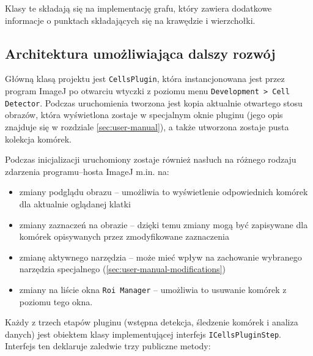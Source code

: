 \documentclass[declaration,shortabstract,mgr]{iithesis}
\begin{document}
Klasy te składają się na implementację grafu, który zawiera dodatkowe informacje o punktach składających się na krawędzie i wierzchołki.

\subsection{Architektura umożliwiająca dalszy rozwój}

Główną klasą projektu jest \texttt{CellsPlugin}, która instancjonowana jest przez program ImageJ po otwarciu wtyczki z poziomu menu \texttt{Development > Cell Detector}.
Podczas uruchomienia tworzona jest kopia aktualnie otwartego stosu obrazów, która wyświetlona zostaje w specjalnym oknie pluginu (jego opis znajduje się w rozdziale \ref{sec:user-manual}), a także utworzona zostaje pusta kolekcja komórek.

Podczas inicjalizacji uruchomiony zostaje również nasłuch na różnego rodzaju zdarzenia programu--hosta ImageJ m.in. na:
\begin{itemize}
  \item zmiany podglądu obrazu -- umożliwia to wyświetlenie odpowiednich komórek dla aktualnie oglądanej klatki
  \item zmiany zaznaczeń na obrazie -- dzięki temu zmiany mogą być zapisywane dla komórek opisywanych przez zmodyfikowane zaznaczenia
  \item zmianę aktywnego narzędzia -- może mieć wpływ na zachowanie wybranego narzędzia specjalnego (\ref{sec:user-manual-modifications})
  \item zmiany na liście okna \texttt{Roi Manager} -- umożliwia to usuwanie komórek z poziomu tego okna.
\end{itemize}

Każdy z trzech etapów pluginu (wstępna detekcja, śledzenie komórek i analiza danych) jest obiektem klasy implementującej interfejs \texttt{ICellsPluginStep}.
Interfejs ten deklaruje zaledwie trzy publiczne metody:
\end{document}
